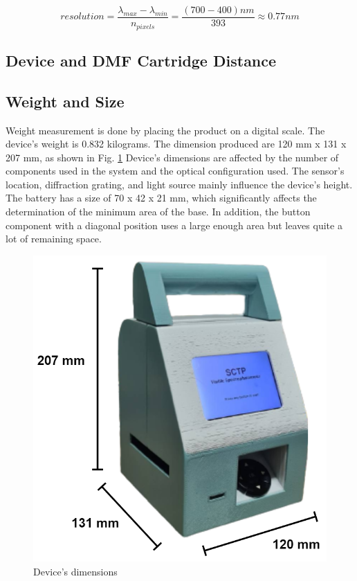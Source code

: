\documentclass[conference]{IEEEtran}
\begin{document}
    \begin{equation}
    resolution=\frac{\lambda_{max} - \lambda_{min}}{n_{pixels}}=\frac{(700 - 400)nm}{393}\approx0.77nm
    \label{resolution}
    \end{equation}

\subsection{Device and DMF Cartridge Distance}

\subsection{Weight and Size}
Weight measurement is done by placing the product on a digital scale.
The device's weight is 0.832 kilograms. 
The dimension produced are 120 mm x 131 x 207 mm, as shown in Fig. \ref{device_dimensions}
Device's dimensions are affected by the number of components used in the system and the optical configuration used. 
The sensor's location, diffraction grating, and light source mainly influence the device's height. 
The battery has a size of 70 x 42 x 21 mm, which significantly affects the determination of the minimum area of the base.
In addition, the button component with a diagonal position uses a large enough area but leaves quite a lot of remaining space.

\begin{figure}[htbp]
    \centerline{\includegraphics[scale=0.25]{SCTP_size.png}}
    \caption{Device's dimensions}
    \label{device_dimensions}
    \end{figure}
\end{document}

